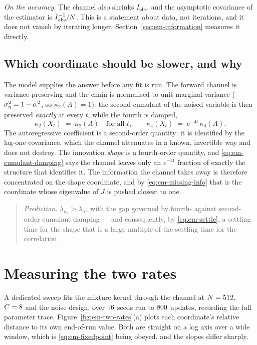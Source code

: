 \emph{On the accuracy.} The channel also shrinks $I_{\mathrm{obs}}$, and the
asymptotic covariance of the estimator is $I_{\mathrm{obs}}^{-1}/N$. This
is a statement about data, not iterations, and it does not vanish by iterating
longer. Section~\ref{sec:em-information} measures it directly.

\subsection{Which coordinate should be slower, and why}
\label{sec:em-which-slower}

The model supplies the answer before any fit is run. The forward channel is
variance-preserving and the chain is normalised to unit marginal variance
($\sigma_\eta^2 = 1 - \alpha^2$, so $\kappa_2(A) = 1$): the second cumulant of the
noised variable is then preserved \emph{exactly} at every $t$, while the
fourth is damped,
\begin{equation}
  \kappa_2(X_t) \;=\; \kappa_2(A) \quad \text{for all } t,
  \qquad
  \kappa_4(X_t) \;=\; e^{-4t}\,\kappa_4(A).
  \label{eq:em-cumulant-damping}
\end{equation}
The autoregressive coefficient is a second-order quantity: it is identified by
the lag-one covariance, which the channel attenuates in a known, invertible way
and does not destroy. The innovation \emph{shape} is a fourth-order quantity,
and \eqref{eq:em-cumulant-damping} says the channel leaves only an
$e^{-4t}$ fraction of exactly the structure that identifies it. The information
the channel takes away is therefore concentrated on the shape coordinate, and
by \eqref{eq:em-missing-info} that is the coordinate whose eigenvalue of $J$ is
pushed closest to one.

\begin{quote}
\emph{Prediction.} $\lambda_{\kappa_4} > \lambda_{\alpha}$, with the gap
governed by fourth- against second-order cumulant damping --- and consequently,
by \eqref{eq:em-settle}, a settling time for the shape that is a large multiple
of the settling time for the correlation.
\end{quote}

\section{Measuring the two rates}\label{sec:em-two-rates}

A dedicated sweep fits the mixture kernel through the channel at
$N = 512$, $C = 8$ and the \convdesign{} noise design, over
$16$ seeds run to $800$ updates, recording the full parameter trace.
Figure~\ref{fig:em-two-rates}(a) plots each coordinate's relative distance to its
own end-of-run value. Both are straight on a log axis over a wide window, which
is \eqref{eq:em-fixedpoint} being obeyed, and the slopes differ sharply.

